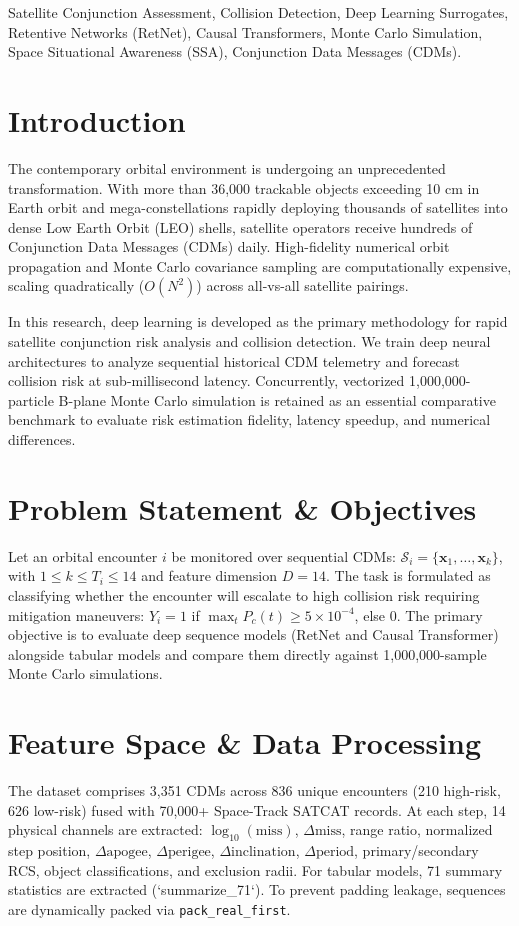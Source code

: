 \documentclass[conference]{IEEEtran}
\begin{document}
\begin{IEEEkeywords}
Satellite Conjunction Assessment, Collision Detection, Deep Learning Surrogates, Retentive Networks (RetNet), Causal Transformers, Monte Carlo Simulation, Space Situational Awareness (SSA), Conjunction Data Messages (CDMs).
\end{IEEEkeywords}

\section{Introduction}
The contemporary orbital environment is undergoing an unprecedented transformation. With more than 36,000 trackable objects exceeding 10 cm in Earth orbit and mega-constellations rapidly deploying thousands of satellites into dense Low Earth Orbit (LEO) shells, satellite operators receive hundreds of Conjunction Data Messages (CDMs) daily. High-fidelity numerical orbit propagation and Monte Carlo covariance sampling are computationally expensive, scaling quadratically ($O(N^2)$) across all-vs-all satellite pairings. 

In this research, deep learning is developed as the primary methodology for rapid satellite conjunction risk analysis and collision detection. We train deep neural architectures to analyze sequential historical CDM telemetry and forecast collision risk at sub-millisecond latency. Concurrently, vectorized 1,000,000-particle B-plane Monte Carlo simulation is retained as an essential comparative benchmark to evaluate risk estimation fidelity, latency speedup, and numerical differences.

\section{Problem Statement \& Objectives}
Let an orbital encounter $i$ be monitored over sequential CDMs: $\mathcal{S}_i = \{\mathbf{x}_1, \dots, \mathbf{x}_k\}$, with $1 \le k \le T_i \le 14$ and feature dimension $D = 14$. The task is formulated as classifying whether the encounter will escalate to high collision risk requiring mitigation maneuvers: $Y_i = 1$ if $\max_{t} P_c(t) \ge 5 \times 10^{-4}$, else $0$. The primary objective is to evaluate deep sequence models (RetNet and Causal Transformer) alongside tabular models and compare them directly against 1,000,000-sample Monte Carlo simulations.

\section{Feature Space \& Data Processing}
The dataset comprises 3,351 CDMs across 836 unique encounters (210 high-risk, 626 low-risk) fused with 70,000+ Space-Track SATCAT records. At each step, 14 physical channels are extracted: $\log_{10}(\text{miss})$, $\Delta \text{miss}$, range ratio, normalized step position, $\Delta \text{apogee}$, $\Delta \text{perigee}$, $\Delta \text{inclination}$, $\Delta \text{period}$, primary/secondary RCS, object classifications, and exclusion radii. For tabular models, 71 summary statistics are extracted (`summarize\_71`). To prevent padding leakage, sequences are dynamically packed via \texttt{pack\_real\_first}.
\end{document}
